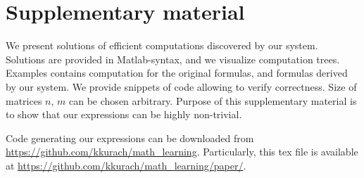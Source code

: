 \documentclass{article} %
\begin{document}
\small



\pagebreak
\section{Supplementary material}
We present solutions of efficient computations discovered by our system. Solutions are provided
in Matlab-syntax, and we visualize computation trees. 
Examples contains computation for the original formulas, and formulas derived by our system.
We provide snippets of code allowing to verify correctness. Size of matrices $n$, $m$ can be chosen
arbitrary. Purpose of this supplementary material is to show that our expressions can be highly
non-trivial.


Code generating our expressions can be downloaded from \url{https://github.com/kkurach/math_learning}.
Particularly, this tex file is available at \url{https://github.com/kkurach/math_learning/paper/}.


\end{document}

